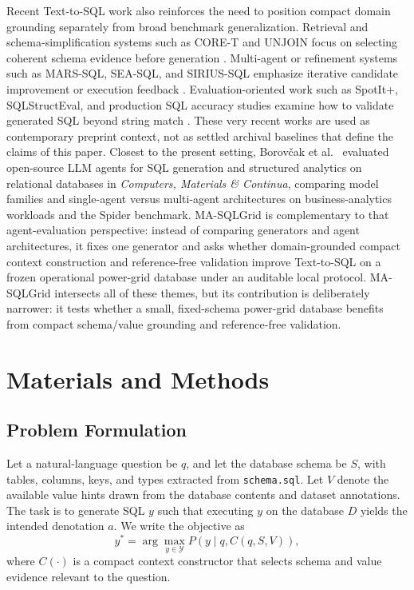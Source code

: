\documentclass[applsci,article,submit,moreauthors]{Definitions/mdpi}
\begin{document}
Recent Text-to-SQL work also reinforces the need to position compact domain grounding separately from broad benchmark generalization. Retrieval and schema-simplification systems such as CORE-T and UNJOIN focus on selecting coherent schema evidence before generation \cite{soliman2026coret,ganesan2025unjoin}. Multi-agent or refinement systems such as MARS-SQL, SEA-SQL, and SIRIUS-SQL emphasize iterative candidate improvement or execution feedback \cite{yang2025marssql,li2024seasql,luo2026siriussql}. Evaluation-oriented work such as SpotIt+, SQLStructEval, and production SQL accuracy studies examine how to validate generated SQL beyond string match \cite{tremante2026spotit,zhou2026sqlstructeval,arif2026agentagnostic}. These very recent works are used as contemporary preprint context, not as settled archival baselines that define the claims of this paper. Closest to the present setting, Borov\v{c}ak et al.~\cite{borovcak2026evaluating} evaluated open-source LLM agents for SQL generation and structured analytics on relational databases in \emph{Computers, Materials \& Continua}, comparing model families and single-agent versus multi-agent architectures on business-analytics workloads and the Spider benchmark. MA-SQLGrid is complementary to that agent-evaluation perspective: instead of comparing generators and agent architectures, it fixes one generator and asks whether domain-grounded compact context construction and reference-free validation improve Text-to-SQL on a frozen operational power-grid database under an auditable local protocol. MA-SQLGrid intersects all of these themes, but its contribution is deliberately narrower: it tests whether a small, fixed-schema power-grid database benefits from compact schema/value grounding and reference-free validation.

\section{Materials and Methods}\label{method}

\subsection{Problem Formulation}\label{sect:m1}

Let a natural-language question be $q$, and let the database schema be $S$, with tables, columns, keys, and types extracted from \texttt{schema.sql}. Let $V$ denote the available value hints drawn from the database contents and dataset annotations. The task is to generate SQL $y$ such that executing $y$ on the database $D$ yields the intended denotation $a$. We write the objective as
\begin{equation}
y^* = \arg\max_{y \in \mathcal{Y}} P(y \mid q, C(q,S,V)),
\end{equation}
where $C(\cdot)$ is a compact context constructor that selects schema and value evidence relevant to the question.
\end{document}
